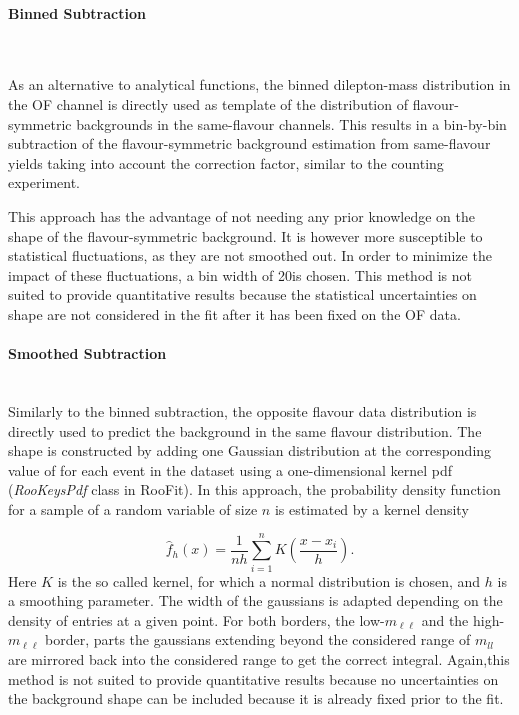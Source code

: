 \paragraph{Binned Subtraction}\mbox{} \\


\label{shapesubtraction:binnedsubtraction}

As an alternative to analytical functions, the binned dilepton-mass distribution in the OF channel is directly used as  template of the distribution of flavour-symmetric backgrounds in the same-flavour channels. This results in a bin-by-bin subtraction of the flavour-symmetric background estimation from same-flavour yields taking into account the \Rsfof correction factor, similar to the counting experiment.

This approach has the advantage of not needing any prior knowledge on the shape of the flavour-symmetric background. It is however more susceptible to statistical fluctuations, as they are not smoothed out. In order to minimize the impact of these fluctuations, a bin width of 20\GeV is chosen. This method is not suited to provide quantitative results because the statistical uncertainties on shape are not considered in the fit after it has been fixed on the OF data.

\paragraph{Smoothed Subtraction}\mbox{} \\
Similarly to the binned subtraction, the opposite flavour data distribution is directly used to predict the background in the same flavour distribution. The shape is constructed by adding one Gaussian distribution at the corresponding value of \mll for each event in the dataset using a one-dimensional kernel pdf (\emph{RooKeysPdf} class in RooFit). In this approach, the probability density function for a sample of a random variable of size $n$ is estimated by a kernel density

\begin{equation}
\hat{f}_h(x) = \frac{1}{nh}\sum\limits_{i=1}^n K(\frac{x-x_i}{h}).
\end{equation}
Here $K$ is the so called kernel, for which a normal distribution is chosen, and $h$ is a smoothing parameter\cite{kernelDensity}. The width of the gaussians is adapted depending on the density of entries at a given point. For both borders, the low-$m_{\ell\ell}$ and the high-$m_{\ell\ell}$ border, parts the gaussians extending beyond the considered range of $m_{ll}$ are mirrored back into the considered range to get the correct integral. Again,this method is not suited to provide quantitative results because no uncertainties on the background shape can be included because it is already fixed prior to the fit.  



